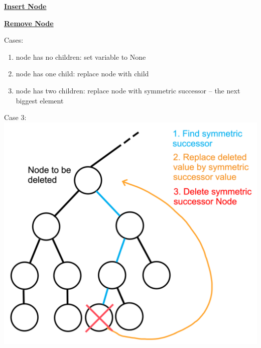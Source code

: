        {\centering\underline{\textbf{Insert Node}} \par}
            

        {\centering\underline{\textbf{Remove Node}} \par}
            \begin{minipage}{0.49\linewidth}
                Cases:
                \begin{enumerate}
                    \item node has no children: set variable to None
                    \item node has one child: replace node with child
                    \item node has two children: replace node with symmetric successor – the next biggest element
                \end{enumerate}
            \end{minipage}
            \begin{minipage}{0.49\linewidth}
                Case 3:\\
                \includegraphics*[width = \linewidth]{src/4_data_structure/images/symmetric_successor.png}
            \end{minipage}

            
